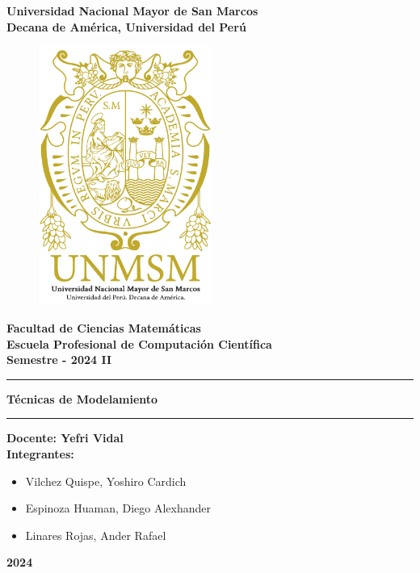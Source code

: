\begin{titlepage}
  \rmfamily
  \begin{center}
  \LARGE\textbf{Universidad Nacional Mayor de San Marcos}\\
  \vspace{2.5mm}
  \large\textbf{Decana de América, Universidad del Perú}\\
  \vspace{2.5mm}
  \begin{figure}[H]
    \centering
    \includegraphics[height=8.5cm]{src/include/logo.png}
  \end{figure}
  \Large\textbf{Facultad de Ciencias Matemáticas}\\
  \vspace{2.5mm}
  \large\textbf{Escuela Profesional de Computación Científica}\\
  \vspace{2.5mm}
  \large\textbf{Semestre - 2024 II}\\
  \rule{\linewidth}{0.55mm}
  \Large\textbf{Técnicas de Modelamiento}\\
  \rule{\linewidth}{0.55mm}
  \large\textbf{Docente: Yefri Vidal}\\
  \vspace{2.5mm}
  \large\textbf{Integrantes:}\\
  \vspace{2.5mm}
  \begin{itemize}
    \normalsize
    \item Vilchez Quispe, Yoshiro Cardich
    \item Espinoza Huaman, Diego Alexhander
    \item Linares Rojas, Ander Rafael
  \end{itemize}
  \vfill
  {\huge\textbf{2024}}
  \end{center}
\end{titlepage}
